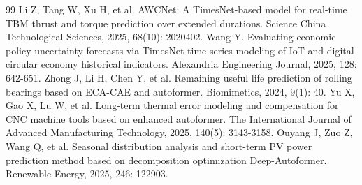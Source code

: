 \documentclass{iopjournal}
\begin{document}
\begin{thebibliography}{99}
 Li Z, Tang W, Xu H, et al. AWCNet: A TimesNet-based model for real-time TBM thrust and torque prediction over extended durations. Science China Technological Sciences, 2025, 68(10): 2020402.
 Wang Y. Evaluating economic policy uncertainty forecasts via TimesNet time series modeling of IoT and digital circular economy historical indicators. Alexandria Engineering Journal, 2025, 128: 642-651.
 Zhong J, Li H, Chen Y, et al. Remaining useful life prediction of rolling bearings based on ECA-CAE and autoformer. Biomimetics, 2024, 9(1): 40.
 Yu X, Gao X, Lu W, et al. Long-term thermal error modeling and compensation for CNC machine tools based on enhanced autoformer. The International Journal of Advanced Manufacturing Technology, 2025, 140(5): 3143-3158.
 Ouyang J, Zuo Z, Wang Q, et al. Seasonal distribution analysis and short-term PV power prediction method based on decomposition optimization Deep-Autoformer. Renewable Energy, 2025, 246: 122903.

\end{thebibliography}
\end{document}
